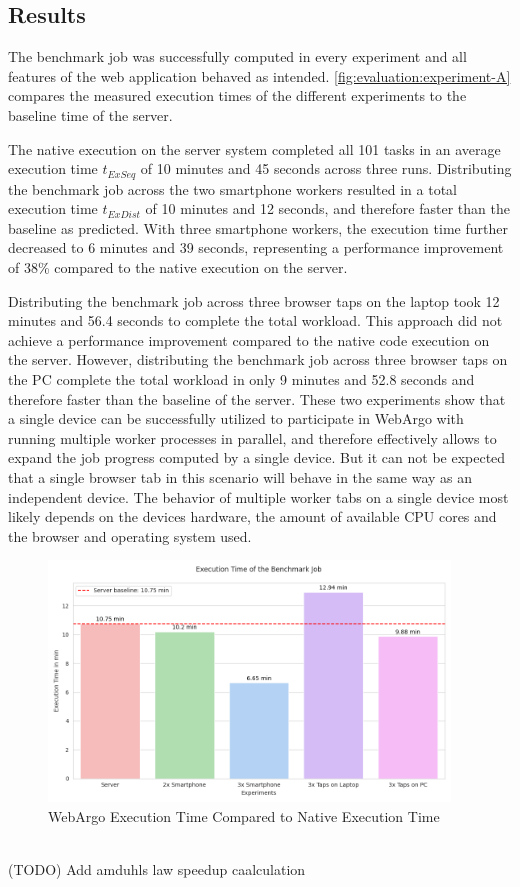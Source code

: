 \subsection{Results}
The benchmark job was successfully computed in every experiment and all features of the web application behaved as intended. \autoref{fig:evaluation:experiment-A} compares the measured execution times of the different experiments to the baseline time of the server.

The native execution on the server system completed all 101 tasks in an average execution time $t_{ExSeq}$ of 10 minutes and 45 seconds across three runs. Distributing the benchmark job across the two smartphone workers resulted in a total execution time $t_{ExDist}$ of 10 minutes and 12 seconds, and therefore faster than the baseline as predicted. With three smartphone workers, the execution time further decreased to 6 minutes and 39 seconds, representing a performance improvement of 38\% compared to the native execution on the server.

Distributing the benchmark job across three browser taps on the laptop took 12 minutes and 56.4 seconds to complete the total workload. This approach did not achieve a performance improvement compared to the native code execution on the server. However, distributing the benchmark job across three browser taps on the \acs{PC} complete the total workload in only 9 minutes and 52.8 seconds and therefore faster than the baseline of the server. These two experiments show that a single device can be successfully utilized to participate in WebArgo with running multiple worker processes in parallel, and therefore effectively allows to expand the job progress computed by a single device. But it can not be expected that a single browser tab in this scenario will behave in the same way as an independent device. The behavior of multiple worker tabs on a single device most likely depends on the devices hardware, the amount of available \acs{CPU} cores and the browser and operating system used.
\begin{figure}[htbp]
    \centering
    \includegraphics[width=0.95\textwidth]{gfx/figures/Evaluation_A.png}
    \caption{WebArgo Execution Time Compared to Native Execution Time}
    \label{fig:evaluation:experiment-A}
\end{figure}
~\\
(TODO) Add amduhls law speedup caalculation

